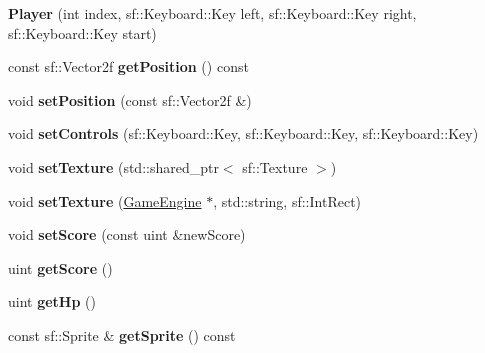 \begin{DoxyCompactItemize}
\item 
\mbox{\label{class_player_aa1b5d40a7f5e26c7588b64ec515d7de7}} 
{\bfseries Player} (int index, sf\+::\+Keyboard\+::\+Key left, sf\+::\+Keyboard\+::\+Key right, sf\+::\+Keyboard\+::\+Key start)
\item 
\mbox{\label{class_player_a6599dac14c1f2ac94e9160c99376333e}} 
const sf\+::\+Vector2f {\bfseries get\+Position} () const
\item 
\mbox{\label{class_player_a9f37a6ecb0abbea3eed1348266135879}} 
void {\bfseries set\+Position} (const sf\+::\+Vector2f \&)
\item 
\mbox{\label{class_player_ab9820af1d231f97e0499b70ed6b34196}} 
void {\bfseries set\+Controls} (sf\+::\+Keyboard\+::\+Key, sf\+::\+Keyboard\+::\+Key, sf\+::\+Keyboard\+::\+Key)
\item 
\mbox{\label{class_player_a7f5f3ce419bc062ab59b6f689c24a5a6}} 
void {\bfseries set\+Texture} (std\+::shared\+\_\+ptr$<$ sf\+::\+Texture $>$)
\item 
\mbox{\label{class_player_a7d0ef1fb581ee3cc89f85c50c9c2c9ad}} 
void {\bfseries set\+Texture} (\mbox{\hyperlink{class_game_engine}{Game\+Engine}} $\ast$, std\+::string, sf\+::\+Int\+Rect)
\item 
\mbox{\label{class_player_a8053d861a3d9d0f91fd7e35a38e7ce14}} 
void {\bfseries set\+Score} (const uint \&new\+Score)
\item 
\mbox{\label{class_player_a7ecb56acd6bf6d77bbc3ff7f3d8cf7d8}} 
uint {\bfseries get\+Score} ()
\item 
\mbox{\label{class_player_ad9329ace9778fed6665610d53842f37a}} 
uint {\bfseries get\+Hp} ()
\item 
\mbox{\label{class_player_aa84e6c6cc5f2f263b9ff9841286d8c42}} 
const sf\+::\+Sprite \& {\bfseries get\+Sprite} () const
\item 
\mbox{\label{class_player_af61ca52f651c2be22d1606a031d919eb}} 

\end{DoxyCompactItemize}

